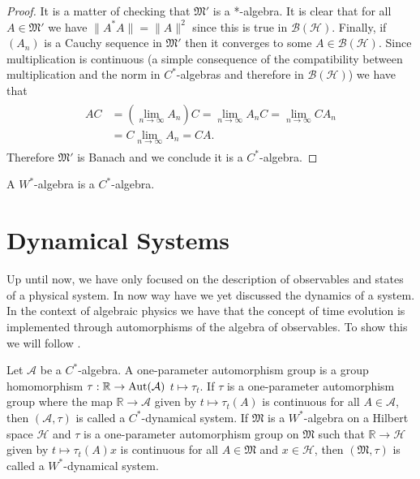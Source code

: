 \begin{proof}
It is a matter of checking that $\mathfrak{M}'$ is a *-algebra. It is clear that for all $A\in\mathfrak{M}'$ we have $\|A^*A\|=\|A\|^2$ since this is true in $\mathcal{B}(\mathcal{H})$. Finally, if $(A_n)$ is a Cauchy sequence in $\mathfrak{M}'$ then it converges to some $A\in\mathcal{B}(\mathcal{H})$. Since multiplication is continuous (a simple consequence of the compatibility between multiplication and the norm in $C^*$-algebras and therefore in $\mathcal{B}(\mathcal{H})$) we have that
\begin{align}
\begin{split}
AC&=(\lim_{n\rightarrow\infty}A_n)C = \lim_{n\rightarrow\infty}A_nC=\lim_{n\rightarrow\infty}CA_n \\
&= C\lim_{n\rightarrow\infty}A_n=CA.
\end{split}
\end{align}
Therefore $\mathfrak{M}'$ is Banach and we conclude it is a $C^*$-algebra.
\end{proof}

\begin{corollary}\label{cor:W_C}
A $W^*$-algebra is a $C^*$-algebra.
\end{corollary}

\section{Dynamical Systems}

Up until now, we have only focused on the description of observables and states of a physical system. In now way have we yet discussed the dynamics of a system. In the context of algebraic physics we have that the concept of time evolution is implemented through automorphisms of the algebra of observables. To show this we will follow \cite{Duvenhage1999}.

\begin{definition}\label{def:dynamics}
Let $\mathcal{A}$ be a $C^*$-algebra. A one-parameter automorphism group is a group homomorphism $\tau:\mathbb{R}\rightarrow \operatorname{Aut}(\mathcal{A})$ $t\mapsto\tau_t$. If $\tau$ is a one-parameter automorphism group where the map $\mathbb{R}\rightarrow\mathcal{A}$ given by $t\mapsto\tau_t(A)$ is continuous for all $A\in\mathcal{A}$, then $(\mathcal{A},\tau)$ is called a $C^*$-dynamical system. If $\mathfrak{M}$ is a $W^*$-algebra on a Hilbert space $\mathcal{H}$ and $\tau$ is a one-parameter automorphism group on $\mathfrak{M}$ such that $\mathbb{R}\rightarrow\mathcal{H}$ given by $t\mapsto\tau_t(A)x$ is continuous for all $A\in\mathfrak{M}$ and $x\in\mathcal{H}$, then $(\mathfrak{M},\tau)$ is called a $W^*$-dynamical system. 
\end{definition}

